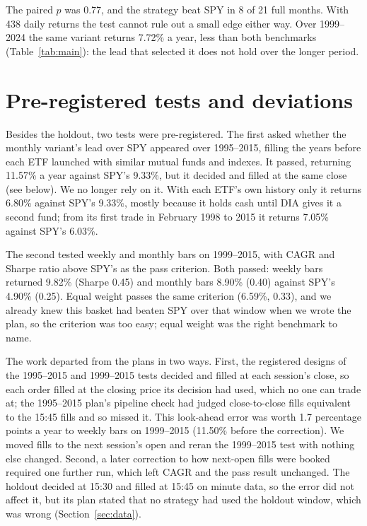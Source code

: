 \documentclass[11pt]{article}
\begin{document}
The paired $p$ was 0.77, and the strategy beat SPY in 8 of 21 full months. With 438 daily returns the test
cannot rule out a small edge either way. Over 1999--2024 the same variant returns 7.72\% a year,
less than both benchmarks (Table~\ref{tab:main}): the lead that selected it does not hold
over the longer period.

\section{Pre-registered tests and deviations}\label{sec:deviations}

Besides the holdout, two tests were pre-registered. The first asked whether the monthly
variant's lead over SPY appeared over 1995--2015, filling the years before each ETF launched
with similar mutual funds and indexes. It passed, returning 11.57\% a year against SPY's 9.33\%,
but it decided and filled at the same close (see below). We no longer rely on it. With each
ETF's own history only it returns 6.80\% against SPY's 9.33\%, mostly because it holds cash
until DIA gives it a second fund; from its first trade in February 1998 to 2015 it returns
7.05\% against SPY's 6.03\%.

The second tested weekly and monthly bars on 1999--2015, with CAGR and Sharpe ratio above SPY's
as the pass criterion. Both passed: weekly bars returned 9.82\% (Sharpe 0.45) and monthly bars
8.90\% (0.40) against SPY's 4.90\% (0.25). Equal weight passes the same criterion (6.59\%, 0.33),
and we already knew this basket had beaten SPY over that window when we wrote the plan, so the
criterion was too easy; equal weight was the right benchmark to name.

The work departed from the plans in two ways. First, the registered designs of the 1995--2015
and 1999--2015 tests decided and filled at each session's close, so each order filled at the
closing price its decision had used, which no one can trade at; the 1995--2015 plan's pipeline
check had judged close-to-close fills equivalent to the 15:45 fills and so missed it. This
look-ahead error was worth 1.7 percentage points a year to weekly bars on 1999--2015 (11.50\%
before the correction). We moved fills to the next session's open and reran the 1999--2015 test
with nothing else changed. Second, a later correction to how next-open fills were booked
required one further run, which left CAGR and the pass result unchanged. The holdout decided at
15:30 and filled at 15:45 on minute data, so the error did not affect it, but its plan stated
that no strategy had used the holdout window, which was wrong (Section~\ref{sec:data}).
\end{document}
